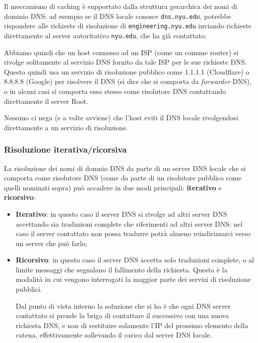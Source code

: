 \documentclass[a4paper,11pt]{article}
\begin{document}
Il meccanismo di caching è supportato dalla struttura gerarchica dei nomi di dominio DNS: ad esempio se il DNS locale conosce \lstinline|dns.nyu.edu|, potrebbe rispondere alle richieste di risoluzione di \lstinline|engineering.nyu.edu| inviando richieste direttamente al server autoritativo \lstinline|nyu.edu|, che ha già contattato.

Abbiamo quindi che un host connesso ad un ISP (come un comune router) si rivolge solitamente al servizio DNS fornito da tale ISP per le sue richieste DNS.
Questo quindi usa un servizio di risoluzione pubblico come 1.1.1.1 (Cloudflare) o 8.8.8.8 (Google) per risolvere il DNS (si dice che si comporta da \textit{forwarder} DNS), o in alcuni casi si comporta esso stesso come risolutore DNS contattando direttamente il server Root.

Nessuno ci nega (e a volte avviene) che l'host eviti il DNS locale rivolgendosi direttamente a un servizio di risoluzione.

\subsubsection{Risoluzione iterativa/ricorsiva}
La risoluzione dei nomi di domnio DNS da parte di un server DNS locale che si comporta come risolutore DNS (come da parte di un risolutore pubblico come quelli nominati sopra) può accadere in due modi principali: \textbf{iterativo} e \textbf{ricorsivo}:
\begin{itemize}
	\item \textbf{Iterativo}: in questo caso il server DNS si rivolge ad altri server DNS accettando sia traduzioni complete che riferimenti ad altri server DNS: nel caso il server contattato non possa tradurre potrà almeno reindirizzarci verso un server che può farlo;
	\item \textbf{Ricorsivo}: in questo caso il server DNS accetta solo traduzioni complete, o al limite messaggi che segnalano il fallimento della richiesta.
		Questa è la modalità in cui vengono interrogati la maggior parte dei servizi di risoluzione pubblici.

		Dal punto di vista interno la soluzione che si ha è che ogni DNS server contattato si prende la briga di contattare il successivo con una nuova richiesta DNS, e non di restituire solamente l'IP del prossimo elemento della catena, effettivamente sollevando il carico dal server DNS locale.
\end{itemize}
\end{document}
